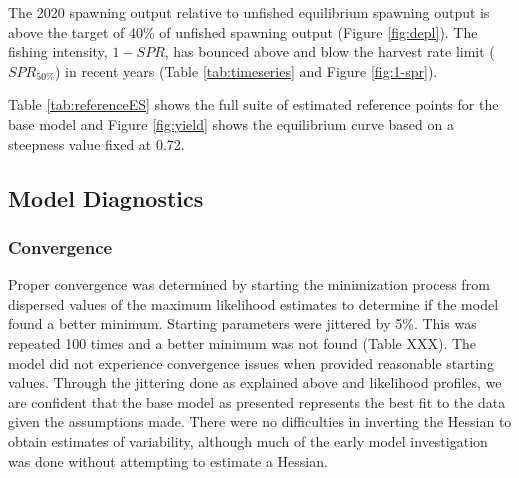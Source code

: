 \documentclass[11pt,
  english,
  a4paper,
]{article}
\begin{document}
\leavevmode\tagmcend\tagstructend\par


The 2020 spawning output relative to unfished equilibrium spawning output is above the target of 40\% of unfished spawning output (Figure \ref{fig:depl}). The fishing intensity, {\(1-SPR\)\leavevmode\tagmcend\tagstructend}, has bounced above and blow the harvest rate limit ({\(SPR_{50\%}\)\leavevmode\tagmcend\tagstructend}) in recent years (Table \ref{tab:timeseries} and Figure \ref{fig:1-spr}).

\leavevmode\tagmcend\tagstructend\par


Table \ref{tab:referenceES} shows the full suite of estimated reference points for the base model and Figure \ref{fig:yield} shows the equilibrium curve based on a steepness value fixed at 0.72.

\leavevmode\tagmcend\tagstructend\par


\hypertarget{model-diagnostics}{%
\subsection{Model Diagnostics}\label{model-diagnostics}}

\leavevmode\tagmcend\tagstructend


\hypertarget{convergence-1}{%
\subsubsection{Convergence}\label{convergence-1}}

\leavevmode\tagmcend\tagstructend


Proper convergence was determined by starting the minimization process from dispersed values of the maximum likelihood estimates to determine if the model found a better minimum. Starting parameters were jittered by 5\%. This was repeated 100 times and a better minimum was not found (Table XXX). The model did not experience convergence issues when provided reasonable starting values. Through the jittering done as explained above and likelihood profiles, we are confident that the base model as presented represents the best fit to the data given the assumptions made. There were no difficulties in inverting the Hessian to obtain estimates of variability, although much of the early model investigation was done without attempting to estimate a Hessian.
\end{document}
